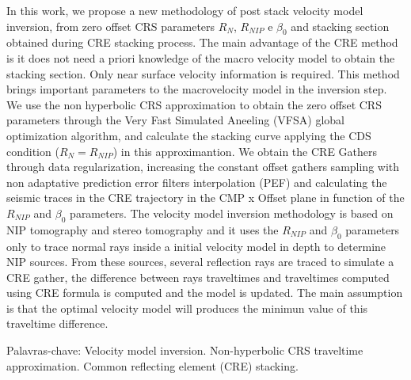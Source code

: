 \documentclass[
	12pt,				%
	openright,			%
	oneside,			%
	a4paper,			%
	english,			%
	brazil				%
	]{abntex2}
\begin{document}
\begin{resumo}
\OnehalfSpacing

In this work, we propose a new methodology of post stack velocity model inversion, from zero offset CRS parameters
$R_N$, $R_{NIP}$ e $\beta_0$ and stacking section obtained during CRE stacking process.
The main advantage of the CRE method is it does not need a priori knowledge of the macro velocity model to obtain the
stacking section. Only near surface velocity information is required.
This method brings important parameters to the macrovelocity model in the inversion step.
We use the non hyperbolic CRS approximation to obtain the zero offset 
CRS parameters through the Very Fast Simulated Aneeling (VFSA)
global optimization algorithm, and calculate the stacking curve applying the 
CDS condition ($R_N=R_{NIP}$) in this approximantion.
We obtain the CRE Gathers through data regularization, increasing the constant offset gathers sampling with
non adaptative prediction error filters interpolation (PEF) and calculating the seismic traces in the CRE trajectory in the 
CMP x Offset plane in function of the $R_{NIP}$ and $\beta_0$ parameters.
The velocity model inversion methodology is based on NIP tomography and stereo tomography and it uses
the $R_{NIP}$ and $\beta_0$ parameters only to trace normal rays inside a initial velocity model in depth
to determine NIP sources. From these sources, several reflection rays are traced to simulate a CRE gather,
the difference between rays traveltimes and traveltimes computed using CRE formula is computed and
the model is updated. The main
assumption is that the optimal velocity model will produces the minimun value of this traveltime
difference.
\vspace{\onelineskip} 
\noindent 
 \par Palavras-chave: Velocity model inversion. Non-hyperbolic CRS traveltime approximation. 
 Common reflecting element (CRE) stacking. 
\end{resumo}

\renewcommand{\listfigurename}{\fontsize{12pt}{\baselineskip}\textbf{LISTA DE ILUSTRAÇÕES}}
\pdfbookmark[0]{\listfigurename}{lof}
\listoffigures*

\cleardoublepage

\tableofcontents*

\cleardoublepage
 
\mainmatter



\end{document}
